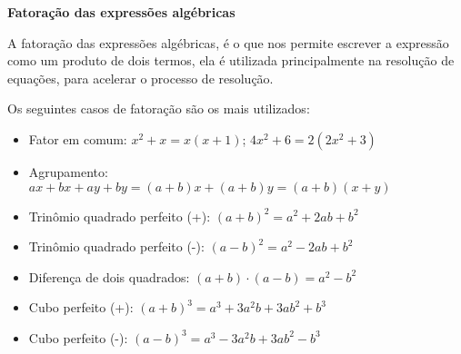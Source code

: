  \vskip0.3cm

  \textbf{Fatoração das expressões algébricas}

 \vskip0.3cm

 A fatoração das expressões algébricas, é o que nos permite escrever a expressão como um produto de dois termos, ela é utilizada principalmente na resolução de equações, para acelerar o processo de resolução.

 Os seguintes casos de fatoração são os mais utilizados:
 \begin{itemize}
  \item Fator em comum: $x^2 + x= x(x + 1)$; $4x^2 + 6= 2(2x^2 + 3)$
  \item Agrupamento: $ax + bx + ay + by= (a+b)x+(a+b)y= (a+b)(x+y)$
  \item Trinômio quadrado perfeito (+): $(a + b)^2= a^2 + 2ab + b^2$
  \item Trinômio quadrado perfeito (-): $(a - b)^2= a^2 - 2ab + b^2$
  \item Diferença de dois quadrados: $(a + b) \cdot (a - b)= a^2 - b^2$
  \item Cubo perfeito (+): $(a+b)^3= a^3 + 3a^2b + 3ab^2 + b^3$
  \item Cubo perfeito (-): $(a-b)^3= a^3 - 3a^2b + 3ab^2 - b^3$
 \end{itemize}
